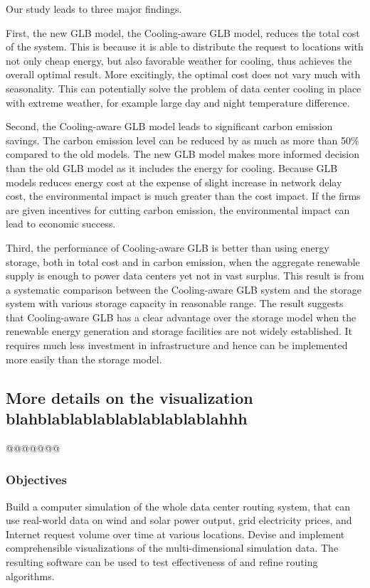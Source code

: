 \documentclass{acm_proc_article-sp}
\begin{document}
Our study leads to three major findings.

First, the new GLB model, the Cooling-aware GLB model, reduces the total cost of the system. This is because it is able to distribute the request to locations with not only cheap energy, but also favorable weather for cooling, thus achieves the overall optimal result. More excitingly, the optimal cost does not vary much with seasonality. This can potentially solve the problem of data center cooling in place with extreme weather, for example large day and night temperature difference.  

Second, the Cooling-aware GLB model leads to significant carbon emission savings. The carbon emission level can be reduced by as much as more than 50\% compared to the old models. The new GLB model makes more informed decision than the old GLB model as it includes the energy for cooling. Because GLB models reduces energy cost at the expense of slight increase in network delay cost, the environmental impact is much greater than the cost impact. If the firms are given incentives for cutting carbon emission, the environmental impact can lead to economic success.  

Third, the performance of Cooling-aware GLB is better than using energy storage, both in total cost and in carbon emission, when the aggregate renewable supply is enough to power data centers yet not in vast surplus. This result is from a systematic comparison between the Cooling-aware GLB system and the storage system with various storage capacity in reasonable range. The result suggests that Cooling-aware GLB has a clear advantage over the storage model when the renewable energy generation and storage facilities are not widely established. It requires much less investment in infrastructure and hence can be implemented more easily than the storage model.


\subsection{More details on the visualization blahblablablablablablablablahhh}
@@@@@@@

\subsubsection{Objectives}
Build a computer simulation of the whole data center routing system, that can use real-world data on wind and solar power output, grid electricity prices, and Internet request volume over time at various locations. Devise and implement comprehensible visualizations of the multi-dimensional simulation data. The resulting software can be used to test effectiveness of and refine routing algorithms.
\end{document}

